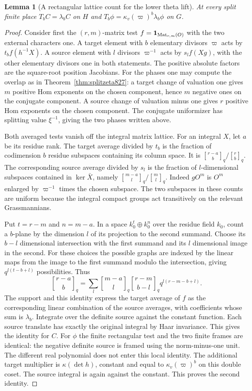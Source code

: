 \documentclass[a4paper,11pt]{article}
\newtheorem{lemma}[proposition]{Lemma}
\theoremstyle{definition}
\theoremstyle{remark}
\numberwithin{equation}{section}
\begin{document}
\begin{lemma}[A rectangular lattice count for the lower theta lift]
\leavevmode\label{lem:secondhecke829}
At every split finite place \(T_b C=\lambda_b C\) on \(H\)
and \(T_b\phi=\kappa_v(\varpi)^b\lambda_b\phi\) on \(G\).
\end{lemma}
\begin{proof}
Consider first the \((r,m)\)-matrix test
\(f={\bf1}_{\operatorname{Mat}_{r,m}(O)}\) with the two
external characters one. A target element with \(b\)
elementary divisors \(\varpi\) acts by
\(t_b f(h^{-1}X)\). A source element with \(l\) divisors
\(\varpi^{-1}\) acts by \(s_l f(Xg)\), with the other
elementary divisors one in both statements. The positive
absolute factors are the square-root position Jacobians.
For the phases one may compute the overlap as in
Theorem~\ref{thm:splitzeta827}: a target change of valuation
one gives \(m\) positive Hom exponents on the chosen component,
hence \(m\) negative ones on the conjugate component. A
source change of valuation minus one gives \(r\) positive
Hom exponents on the chosen component. The conjugate
uniformizer has splitting value \(\xi^{-1}\), giving the
two phases written above.

Both averaged tests vanish off the integral matrix lattice.
For an integral \(X\), let \(a\) be its residue rank. The
target average divided by \(t_b\) is the fraction of
codimension \(b\) residue subspaces containing its column
space. It is \({r-a\brack b}_q/{r\brack b}_q\).
The corresponding source average divided by \(s_l\) is
the fraction of \(l\)-dimensional subspaces contained in
\(\ker\bar X\), namely \({m-a\brack l}_q/{m\brack l}_q\).
Indeed \(gO^m\) is \(O^m\) enlarged by \(\varpi^{-1}\)
times the chosen subspace. The two subspaces in these
counts are uniform because the integral compact groups
act transitively on the relevant Grassmannians.

Put \(t=r-m\) and \(n=m-a\). In a space \(k_0^t\oplus k_0^n\)
over the residue field \(k_0\), count a \(b\)-plane by the
dimension \(l\) of its projection to the second summand.
Choose its \(b-l\) dimensional intersection with the first
summand and its \(l\) dimensional image in the second.
For these choices the possible graphs are indexed by the
linear maps from the image to the first summand modulo the
intersection, giving \(q^{l(t-b+l)}\) possibilities. Thus
\[
 {r-a\brack b}_q=
   \sum_l {m-a\brack l}_q {r-m\brack b-l}_q q^{l(r-m-b+l)} .
\]
The support and this identity express the target average of
\(f\) as the corresponding linear combination of the source
averages, with coefficients whose sum is \(\lambda_b\).
Integrate over the definite source against the constant
function. Each source translate has exactly the original
integral by Haar invariance. This gives the identity for
\(C\). For \(\phi\) the finite rectangular test and the two
finite frames are identical: the negative definite source
is framed using the norm-minus-one unit. The different real
polynomial does not enter this local identity. The additional
target multiplier is \(\kappa(\det h)\), constant and equal
to \(\kappa_v(\varpi)^b\) on this double coset. The source
integral is again against the constant. This proves the
second identity.
\end{proof}
\end{document}

